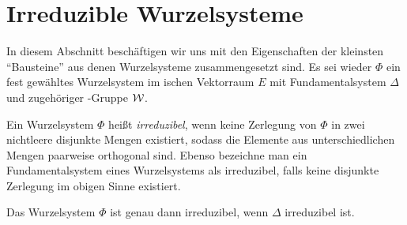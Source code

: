 \section{Irreduzible Wurzelsysteme}
\label{sec:irreduc}

In diesem Abschnitt beschäftigen wir uns mit den Eigenschaften der kleinsten ``Bausteine'' aus denen Wurzelsysteme zusammengesetzt sind.
Es sei wieder $\Phi$ ein fest gewähltes Wurzelsystem im \euklid ischen Vektorraum $E$ mit Fundamentalsystem $\Delta$ und zugehöriger \weyl\hyp{}Gruppe $\mathcal{W}$.

\begin{defn}
  Ein Wurzelsystem $\Phi$ heißt \emph{irreduzibel}, wenn keine Zerlegung von $\Phi$ in zwei nichtleere disjunkte Mengen existiert, sodass die Elemente aus unterschiedlichen Mengen paarweise orthogonal sind.
  Ebenso bezeichne man ein Fundamentalsystem eines Wurzelsystems als irreduzibel, falls keine disjunkte Zerlegung im obigen Sinne existiert.
\end{defn}

\begin{lem}
  \label{lem:irreducibleRoot}
  Das Wurzelsystem $\Phi$ ist genau dann irreduzibel, wenn $\Delta$ irreduzibel ist.
\end{lem}

